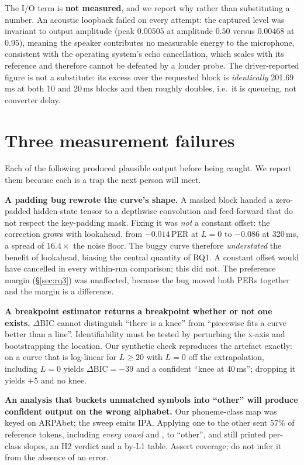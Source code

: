 \documentclass[9pt,a4paper,twocolumn]{article}
\begin{document}
The I/O term is \textbf{not measured}, and we report why rather than
substituting a number. An acoustic loopback failed on every attempt: the
captured level was invariant to output amplitude (peak $0.00505$ at amplitude
$0.50$ versus $0.00468$ at $0.95$), meaning the speaker contributes no
measurable energy to the microphone, consistent with the operating system's
echo cancellation, which scales with its reference and therefore cannot be
defeated by a louder probe. The driver-reported figure is not a substitute: its
excess over the requested block is \emph{identically} 201.69\,ms at both 10 and
20\,ms blocks and then roughly doubles, i.e.\ it is queueing, not converter
delay.

\section{Three measurement failures}
\label{sec:lessons}

Each of the following produced plausible output before being caught. We report
them because each is a trap the next person will meet.

\textbf{A padding bug rewrote the curve's shape.} A masked block handed a
zero-padded hidden-state tensor to a depthwise convolution and feed-forward
that do not respect the key-padding mask. Fixing it was \emph{not} a constant
offset: the correction grows with lookahead, from $-0.014$\,PER at $L{=}0$ to
$-0.086$ at 320\,ms, a spread of $16.4\times$ the noise floor. The buggy curve
therefore \emph{understated} the benefit of lookahead, biasing the central
quantity of RQ1. A constant offset would have cancelled in every within-run
comparison; this did not. The preference margin (\S\ref{sec:rq3}) was
unaffected, because the bug moved both PERs together and the margin is a
difference.

\textbf{A breakpoint estimator returns a breakpoint whether or not one
exists.} $\Delta$BIC cannot distinguish ``there is a knee'' from ``piecewise
fits a curve better than a line''. Identifiability must be tested by perturbing
the x-axis and bootstrapping the location. Our synthetic check reproduces the
artefact exactly: on a curve that is log-linear for $L\geq20$ with $L{=}0$ off
the extrapolation, including $L{=}0$ yields $\Delta\mathrm{BIC}=-39$ and a
confident ``knee at 40\,ms''; dropping it yields $+5$ and no knee.

\textbf{An analysis that buckets unmatched symbols into ``other'' will produce
confident output on the wrong alphabet.} Our phoneme-class map was keyed on
ARPAbet; the sweep emits IPA. Applying one to the other sent 57\% of reference
tokens, including \emph{every vowel} and , to ``other'', and
still printed per-class slopes, an H2 verdict and a by-L1 table. Assert
coverage; do not infer it from the absence of an error.
\end{document}
